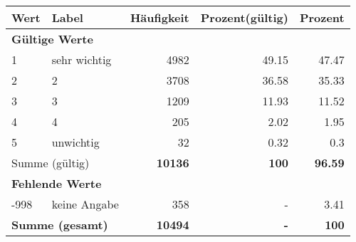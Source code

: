      \begin{longtable}{lXrrr}
     \toprule
     \textbf{Wert} & \textbf{Label} & \textbf{Häufigkeit} & \textbf{Prozent(gültig)} & \textbf{Prozent} \\
     \endhead
     \midrule
     \multicolumn{5}{l}{\textbf{Gültige Werte}}\\

     1 &
     \multicolumn{1}{X}{ sehr wichtig   } &


       \num{4982} &
       \num[round-mode=places,round-precision=2]{49.15} &
         \num[round-mode=places,round-precision=2]{47.47} \\

     2 &
     \multicolumn{1}{X}{ 2   } &


       \num{3708} &
       \num[round-mode=places,round-precision=2]{36.58} &
         \num[round-mode=places,round-precision=2]{35.33} \\

     3 &
     \multicolumn{1}{X}{ 3   } &


       \num{1209} &
       \num[round-mode=places,round-precision=2]{11.93} &
         \num[round-mode=places,round-precision=2]{11.52} \\

     4 &
     \multicolumn{1}{X}{ 4   } &


       \num{205} &
       \num[round-mode=places,round-precision=2]{2.02} &
         \num[round-mode=places,round-precision=2]{1.95} \\

     5 &
     \multicolumn{1}{X}{ unwichtig   } &


       \num{32} &
       \num[round-mode=places,round-precision=2]{0.32} &
         \num[round-mode=places,round-precision=2]{0.3} \\
     \midrule
     \multicolumn{2}{l}{Summe (gültig)} &
       \textbf{\num{10136}} &
     \textbf{\num{100}} &
       \textbf{\num[round-mode=places,round-precision=2]{96.59}} \\
     \multicolumn{5}{l}{\textbf{Fehlende Werte}}\\
       -998 &
       keine Angabe &
         \num{358} &
        - &
         \num[round-mode=places,round-precision=2]{3.41} \\
     \midrule
     \multicolumn{2}{l}{\textbf{Summe (gesamt)}} &
          \textbf{\num{10494}} &
        \textbf{-} &
        \textbf{\num{100}} \\
     \bottomrule
     \end{longtable}
     
